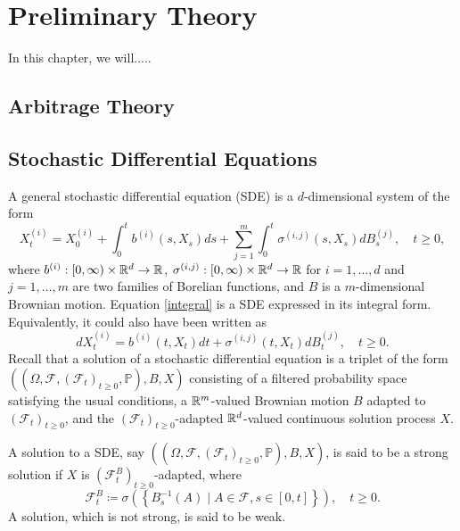 \chapter{Preliminary Theory}
In this chapter, we will.....

\section{Arbitrage Theory}

\section{Stochastic Differential Equations}\label{section:SDE}
A general stochastic differential equation (SDE) is a $d$-dimensional system of the form
\begin{equation}\label{integral}
    X_{t}^{(i)}=X_{0}^{(i)}+ \int_{0}^{t}b^{(i)}(s,X_{s})ds+\sum_{j=1}^{m}\int_{0}^{t}\sigma^{(i,j)}(s,X_{s})dB_{s}^{(j)},\quad t\geq 0,
\end{equation}
where $b^{(i)}:[0,\infty)\times \mathbb{R}^{d}\to \mathbb{R}$, $\sigma^{(i,j)}:[0,\infty)\times\mathbb{R}^{d}\to\mathbb{R}$ for $i=1,\dots,d$ and $j=1,\dots,m$ are two families of Borelian functions, and $B$ is a $m$-dimensional Brownian motion. Equation \eqref{integral} is a SDE expressed in its integral form. Equivalently, it could also have been written as
\begin{equation}
    dX_{t}^{(i)}= b^{(i)}(t,X_{t})dt +\sigma^{(i,j)}(t,X_{t})dB_{t}^{(j)}, \quad t\geq 0.
\end{equation}
Recall that a solution of a stochastic differential equation is a triplet of the form \newline$\left((\Omega,\mathcal{F},(\mathcal{F}_{t})_{t\geq 0},\mathbb{P}),B,X\right)$ consisting of a filtered probability space satisfying the usual conditions, a $\mathbb{R}^{m}$-valued Brownian motion $B$ adapted to $(\mathcal{F}_{t})_{t\geq 0}$, and the $(\mathcal{F}_{t})_{t\geq 0}$-adapted $\mathbb{R}^{d}$-valued continuous solution process $X$.

A solution to a SDE, say $\left((\Omega,\mathcal{F},(\mathcal{F}_{t})_{t\geq 0},\mathbb{P}),B,X\right)$, is said to be a strong solution if $X$ is $(\mathcal{F}_{t}^{B})_{t\geq 0}$-adapted, where 
\begin{equation}
    \mathcal{F}_{t}^{B}\coloneqq \sigma\left(\left\{B_{s}^{-1}(A)\mid A\in\mathcal{F}, s\in [0,t] \right\}\right),\quad t\geq 0.
\end{equation}
A solution, which is not strong, is said to be weak. 

